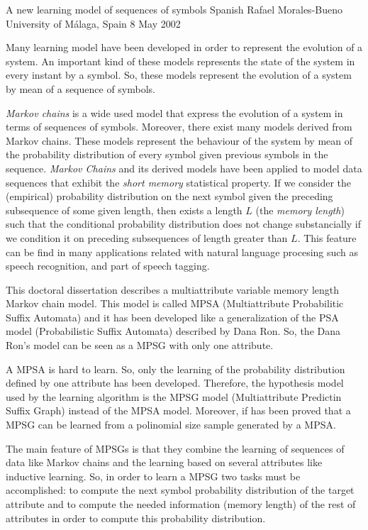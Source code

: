 \documentclass[final]{beatcs}
\begin{document}
{%
A new learning model of sequences of symbols}
{%
Spanish}
{%
Rafael Morales-Bueno}
{%
University of Málaga, Spain}
{%
8 May 2002}

 Many learning model have been developed in order to represent the
 evolution of a system. An important kind of these models represents
 the state of the system in every instant by a symbol. So, these
 models represent the evolution of a system by mean of a sequence of
 symbols. 

 \emph{Markov chains} is a wide used model that express the evolution
 of a system in terms of sequences of symbols. Moreover, there exist
 many models derived from Markov chains.  These models represent the
 behaviour of the system by mean of the probability distribution of
 every symbol given previous symbols in the sequence. \emph{Markov
   Chains} and its derived models have been applied to model data
 sequences that exhibit the \emph{short memory} statistical property.
 If we consider the (empirical) probability distribution on the next
 symbol given the preceding subsequence of some given length, then
 exists a length $L$ (the \emph{memory length}) such that the
 conditional probability distribution does not change substancially if
 we condition it on preceding subsequences of length greater than $L$.
 This feature can be find in many applications related with natural
 language procesing such as speech recognition, and part of speech
 tagging.

 This doctoral dissertation describes a multiattribute variable memory
 length Markov chain model. This model is called MPSA (Multiattribute
 Probabilitic Suffix Automata) and it has been developed like a
 generalization of the PSA model (Probabilistic Suffix Automata)
 described by Dana Ron. So, the Dana Ron's model can be seen as a MPSG
 with only one attribute.

 A MPSA is hard to learn. So, only the learning of the probability
 distribution defined by one attribute has been developed. Therefore,
 the hypothesis model used by the learning algorithm is the MPSG model
 (Multiattribute Predictin Suffix Graph) instead of the MPSA model.
 Moreover, if has been proved that a MPSG can be learned from a
 polinomial size sample generated by a MPSA.

 The main feature of MPSGs is that they combine the learning of
 sequences of data like Markov chains and the learning based on
 several attributes like inductive learning. So, in order to learn a
 MPSG two tasks must be accomplished: to compute the next symbol
 probability distribution of the target attribute and to compute the
 needed information (memory length) of the rest of attributes in order
 to compute this probability distribution.
\end{document}
